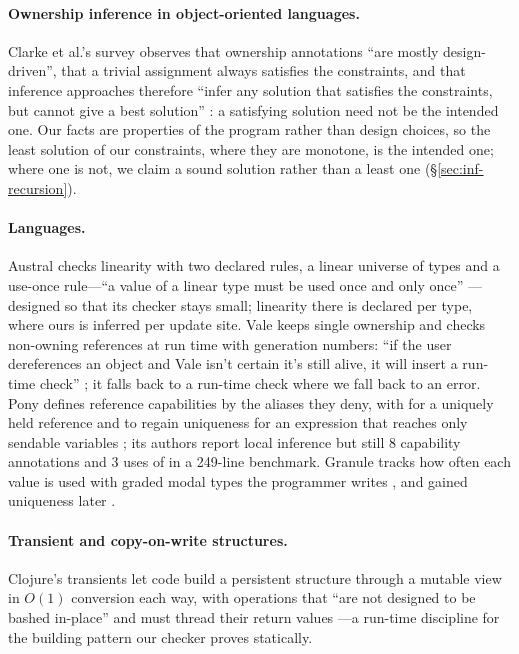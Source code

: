 \paragraph{Ownership inference in object-oriented languages.} Clarke et al.'s survey observes that
ownership annotations ``are mostly design-driven'', that a trivial assignment always satisfies the
constraints, and that inference approaches therefore ``infer any solution that satisfies the constraints,
but cannot give a best solution'' \citep[\S5]{clarke2013survey}: a satisfying solution need not be the
intended one. Our facts are properties of the program rather than design choices, so the least solution of
our constraints, where they are monotone, is the intended one; where one is not, we claim a sound solution
rather than a least one (\S\ref{sec:inf-recursion}).

\paragraph{Languages.} Austral checks linearity with two declared rules, a linear universe of types and a
use-once rule---``a value of a linear type must be used once and only once'' \citep{austral}---designed so
that its checker stays small; linearity there is declared per type, where ours is inferred per update site.
Vale keeps single ownership and checks non-owning references at run time with generation numbers:
``if the user dereferences an object and Vale isn't certain it's still alive, it will insert a run-time
check'' \citep{vale}; it falls back to a run-time check where we fall back to an error. Pony defines
reference capabilities by the aliases they deny, with  for a uniquely held reference and
 to regain uniqueness for an expression that reaches only sendable variables \citep{pony}; its
authors report local inference but still 8 capability annotations and 3 uses of  in a
249-line benchmark. Granule tracks how often each value is used with graded modal types the programmer
writes \citep{granule}, and gained uniqueness later \citep{marshall2022entente}.

\paragraph{Transient and copy-on-write structures.} Clojure's transients let code build a persistent
structure through a mutable view in $O(1)$ conversion each way, with operations that ``are not designed to be
bashed in-place'' and must thread their return values \citep{hickey2009transients}---a run-time discipline for
the building pattern our checker proves statically.
